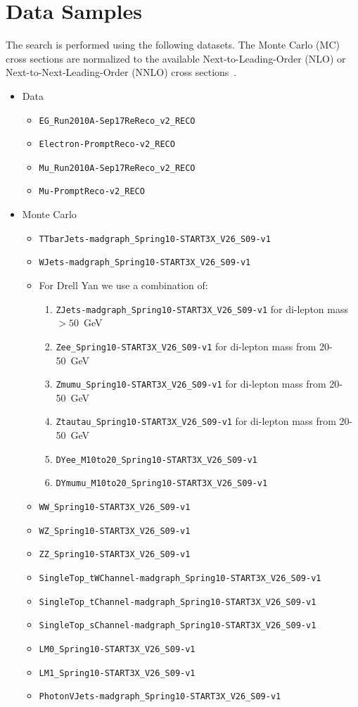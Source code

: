 \section{Data Samples}
\label{sec:datasamples}

The search is performed using the following datasets. The Monte Carlo (MC) cross sections
are normalized to the available Next-to-Leading-Order (NLO) or Next-to-Next-Leading-Order (NNLO) 
cross sections~\cite{xsection}. 

\begin{itemize}
\item Data 
\begin{itemize}
\item \verb=EG_Run2010A-Sep17ReReco_v2_RECO=
\item \verb=Electron-PromptReco-v2_RECO=
\item \verb=Mu_Run2010A-Sep17ReReco_v2_RECO=
\item \verb=Mu-PromptReco-v2_RECO=
\end{itemize}
\item Monte Carlo 
\begin{itemize}
\item \verb=TTbarJets-madgraph_Spring10-START3X_V26_S09-v1=
\item \verb=WJets-madgraph_Spring10-START3X_V26_S09-v1=
\item For Drell Yan we use a combination of:
\begin{enumerate}
\item \verb=ZJets-madgraph_Spring10-START3X_V26_S09-v1= for di-lepton mass $>50$\ GeV
\item \verb=Zee_Spring10-START3X_V26_S09-v1= for di-lepton mass from 20-50\ GeV
\item \verb=Zmumu_Spring10-START3X_V26_S09-v1= for di-lepton mass from 20-50\ GeV
\item \verb=Ztautau_Spring10-START3X_V26_S09-v1=  for di-lepton mass from 20-50\ GeV
\item \verb=DYee_M10to20_Spring10-START3X_V26_S09-v1=
\item \verb=DYmumu_M10to20_Spring10-START3X_V26_S09-v1=
\end{enumerate}
\item \verb=WW_Spring10-START3X_V26_S09-v1=
\item \verb=WZ_Spring10-START3X_V26_S09-v1=
\item \verb=ZZ_Spring10-START3X_V26_S09-v1=
\item \verb=SingleTop_tWChannel-madgraph_Spring10-START3X_V26_S09-v1=
\item \verb=SingleTop_tChannel-madgraph_Spring10-START3X_V26_S09-v1=
\item \verb=SingleTop_sChannel-madgraph_Spring10-START3X_V26_S09-v1=
\item \verb=LM0_Spring10-START3X_V26_S09-v1=
\item \verb=LM1_Spring10-START3X_V26_S09-v1=
\item \verb=PhotonVJets-madgraph_Spring10-START3X_V26_S09-v1=
\end{itemize}
\end{itemize}

